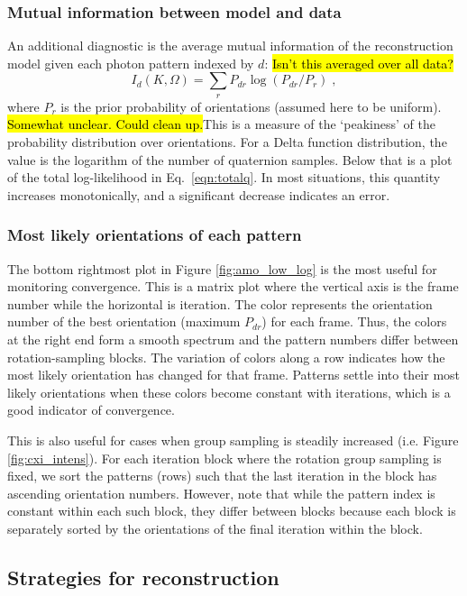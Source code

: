 \documentclass[preprint]{iucr}              %
\begin{document}
\subsubsection{Mutual information between model and data}
An additional diagnostic is the average mutual information of the reconstruction model given each photon pattern indexed by $d$: \hl{Isn't this averaged over all data?}
\begin{equation}
I_d(K, \Omega) = \sum_r P_{dr} \log(P_{dr} / P_{r})\;,
\end{equation}
where $P_r$ is the prior probability of orientations (assumed here to be uniform). \hl{Somewhat unclear. Could clean up.}This is a measure of the `peakiness' of the probability distribution over orientations. For a Delta function distribution, the value is the logarithm of the number of quaternion samples. Below that is a plot of the total log-likelihood in Eq.~\ref{eqn:totalq}. In most situations, this quantity increases monotonically, and a significant decrease indicates an error. 

\subsubsection{Most likely orientations of each pattern}
The bottom rightmost plot in Figure \ref{fig:amo_low_log} is the most useful for monitoring convergence. This is a matrix plot where the vertical axis is the frame number while the horizontal is iteration. The color represents the orientation number of the best orientation (maximum $P_{dr}$) for each frame. Thus, the colors at the right end form a smooth spectrum and the pattern numbers differ between rotation-sampling blocks. The variation of colors along a row indicates how the most likely orientation has changed for that frame. Patterns settle into their most likely orientations when these colors become constant with iterations, which is a good indicator of convergence.

This is also useful for cases when group sampling is steadily increased (i.e. Figure \ref{fig:cxi_intens}). For each iteration block where the rotation group sampling is fixed, we sort the patterns (rows) such that the last iteration in the block has ascending orientation numbers. However, note that while the pattern index is constant within each such block, they differ between blocks because each block is separately sorted by the orientations of the final iteration within the block.

\subsection{Strategies for reconstruction} \label{subsec:strategy}
\end{document}
